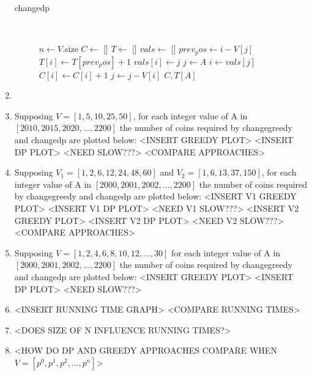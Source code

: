 \documentclass[paper=a4, fontsize=11pt]{scrartcl} %
\numberwithin{equation}{section} %
\numberwithin{figure}{section} %
\numberwithin{table}{section} %
\begin{document}
\begin{enumerate}
\begin{description}
        \item[changedp] \hfill \\
        \begin{algorithmic}
                \State $n \gets V$.size
                \State $C \gets$ []
                \State $T \gets$ []
                \State $vals \gets$ []
                        \State $prev_pos \gets i - V[j]$
                                \State $T[i] \gets T[prev_pos] + 1$
                                \State $vals[i] \gets j$
                            \EndIf
                        \EndIf
                    \EndFor
                \EndFor
                \State $j \gets A$
                    \State $i \gets vals[j]$
                    \State $C[i] \gets C[i] + 1$
                    \State $j \gets j - V[i]$
                \EndWhile
                \Return $C, T[A]$
            \EndFunction
        \end{algorithmic}
    \end{description}
    
    \item <Proof of correctness of dynamic programming approach>
    
    \item Supposing $V = [1, 5, 10, 25, 50]$, for each integer value of A in $[2010, 2015, 2020, ..., 2200]$ the number of coins required by changegreedy and changedp are plotted below: <INSERT GREEDY PLOT> <INSERT DP PLOT> <NEED SLOW???> <COMPARE APPROACHES>
    
    \item Supposing $V_1 = [1, 2, 6, 12, 24, 48, 60]$ and $V_2 = [1, 6, 13, 37, 150]$, for each integer value of A in $[2000, 2001, 2002, ..., 2200]$ the number of coins required by changegreedy and changedp are plotted below: <INSERT V1 GREEDY PLOT> <INSERT V1 DP PLOT> <NEED V1 SLOW???> <INSERT V2 GREEDY PLOT> <INSERT V2 DP PLOT> <NEED V2 SLOW???> <COMPARE APPROACHES>
    
    \item Supposing $V = [1, 2, 4, 6, 8, 10, 12, ..., 30]$ for each integer value of A in $[2000, 2001, 2002, ..., 2200]$ the number of coins required by changegreedy and changedp are plotted below: <INSERT GREEDY PLOT> <INSERT DP PLOT> <NEED SLOW???>
    
    \item <INSERT TREND LINE EQUATIONS AND FIND RUNTIME> <INSERT RUNNING TIME GRAPH> <COMPARE RUNNING TIMES>
    
    \item <PLOT RUNNING TIMES AS FUNCTION OF NUMBER OF DENOMINATIONS> <DOES SIZE OF N INFLUENCE RUNNING TIMES?>
    
    \item <HOW DO DP AND GREEDY APPROACHES COMPARE WHEN $V = [p^0, p^1, p^2, ..., p^n]$>
\end{enumerate}
\end{document}
